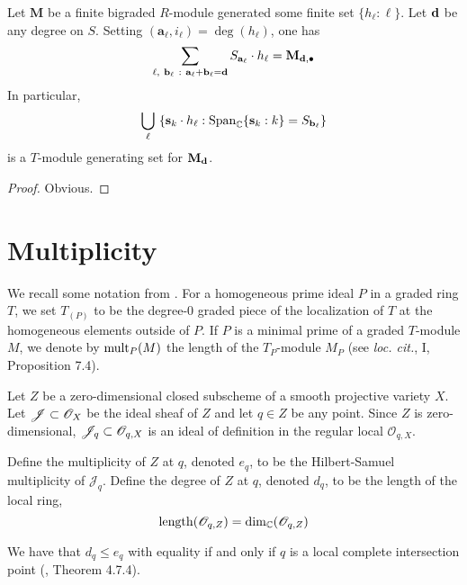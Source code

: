 \documentclass[fleqn,reqno]{amsart}
\numberwithin{first}{chapter}
\begin{document}
\begin{lemma}
\label{lemma:push-gens}
Let $\mathbf M$ be a finite bigraded $R$-module generated some finite set $\{h_\ell:\ell\}$.
Let $\mathbf d$ be any degree on $S$.
Setting $({\mathbf a}_\ell,i_\ell)=\deg(h_\ell)$, one has
\[
	\displaystyle\sum_{\ell,~{\mathbf b}_\ell~:~{\mathbf a}_\ell+{\mathbf b}_\ell=\mathbf d}
	S_{{\mathbf a}_\ell}\cdot h_\ell={\mathbf M}_{\mathbf d,\bullet}
\]
In particular,
\[
	\displaystyle\bigcup_{\ell}~\{\mathbf s_k\cdot h_\ell:\operatorname{Span}_{\mathbb{C}}\{\mathbf s_k:k\}=
	S_{{\mathbf b}_\ell}\}
\]
is a $T$-module generating set for $\mathbf M_\mathbf d$.
\end{lemma}

\begin{proof}
Obvious.
\end{proof}




\section{Multiplicity}

\begin{paragraf}
\label{par:mult-ha}
We recall some notation from \cite{Har-book-77}. For a homogeneous
prime ideal $P$ in a graded ring $T$, we set $T_{(P)}$ to be the degree-0 graded piece of the localization
of $T$ at the homogeneous elements outside of $P$. If $P$ is a minimal prime of a graded $T$-module
$M$, we denote by $\operatorname{mult}_P(M)$ the length of the $T_P$-module $M_P$ (see {\em loc. cit.}, I, Proposition 7.4).
\end{paragraf}

\begin{paragraf}
\label{par:mult}
Let $Z$ be a zero-dimensional closed subscheme of a smooth projective variety $X$.
Let $\mathscr{J}\subset\mathscr{O}_X$ be the ideal sheaf of $Z$
and let $q\in Z$ be any point.
Since $Z$ is zero-dimensional, $\mathscr{J}_q\subset\mathscr{O}_{q,X}$ is an ideal of definition
in the regular local $\mathscr{O}_{q,X}$.

Define the multiplicity of $Z$ at $q$, denoted $e_q$,
to be the Hilbert-Samuel multiplicity of $\mathscr{J}_q$.
Define the degree of $Z$ at $q$, denoted $d_q$, to be the length of the local ring,
\[	
	\operatorname{length}(\mathscr{O}_{q,Z})=\dim_{\mathbb{C}}(\mathscr{O}_{q,Z})
\]

We have that $d_q\leq e_q$ with equality if and only if $q$ is a local complete intersection
point (\citet{BH-98-CMrings}, Theorem 4.7.4).
\end{paragraf}
\end{document}
